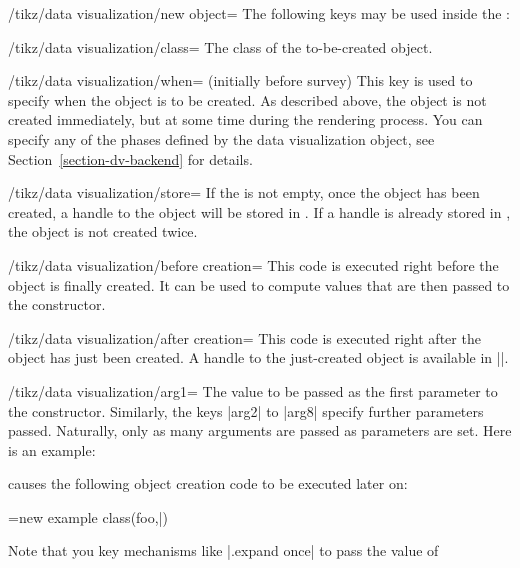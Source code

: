 \begin{key}{/tikz/data visualization/new object=}
  The following keys may be used inside the :
  \begin{key}{/tikz/data visualization/class=}
    The class of the to-be-created object.
  \end{key}
  \begin{key}{/tikz/data visualization/when=
      (initially before survey)}
    This key is used to specify when the object is to be created. As
    described above, the object is not created immediately, but at
    some time during the rendering process. You can specify any of the
    phases defined by the data visualization object, see
    Section~\ref{section-dv-backend} for details.
  \end{key}
  \begin{key}{/tikz/data visualization/store=}
    If the  is not empty, once the object has been
    created, a handle to the object will be stored in . If a handle is already stored in , the
    object is not created twice.
  \end{key}
  \begin{key}{/tikz/data visualization/before creation=}
    This code is executed right before the object is finally
    created. It can be used to compute values that are then passed to
    the constructor.
  \end{key}
  \begin{key}{/tikz/data visualization/after creation=}
    This code is executed right after the object has just been 
    created. A handle to the just-created object is available in
    |\tikzdvobj|. 
  \end{key}
  \begin{key}{/tikz/data visualization/arg1=}
    The value to be passed as the first parameter to the
    constructor. Similarly, the keys |arg2| to |arg8| specify further
    parameters passed. Naturally, only as many arguments are passed as
    parameters are set. Here is an example:
\begin{codeexample}
\end{codeexample}
  causes the following object creation code to be executed later on: 
\begin{codeexample}
\pgfoonew \tikzdvobj=new example class(foo,\bar)
\end{codeexample}
    Note that you key mechanisms like |.expand once| to pass the value of

\end{key}
\end{key}
